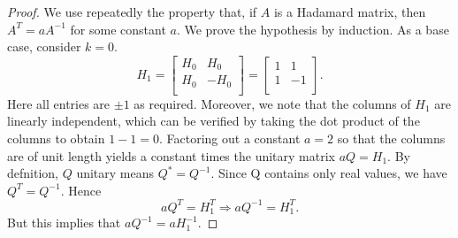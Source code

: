\documentclass{article}
\begin{document}
\begin{proof}
    We use repeatedly the property that, if $A$ is a Hadamard matrix, then $A^T = aA^{-1}$ for some constant $a$. We prove the hypothesis by induction. As a base case, consider $k=0$.
    \[H_1 = \begin{bmatrix}
        H_0 & H_0\\
        H_0 & -H_0\\
    \end{bmatrix} = \begin{bmatrix}
        1 & 1\\
        1 & -1\\
    \end{bmatrix}.\]
    Here all entries are $\pm 1$ as required. Moreover, we note that the columns of $H_1$ are linearly independent, which can be verified by taking the dot product of the columns to obtain $1 - 1 = 0$. Factoring out a constant $a = 2$ so that the columns are of unit length yields a constant times the unitary matrix $aQ = H_1$. By defnition, $Q$ unitary means $Q^* = Q^{-1}$. Since Q contains only real values, we have $Q^T = Q^{-1}$. Hence
    \[aQ^T = H_1^T \Rightarrow aQ^{-1} = H_1^T.\] But this implies that $aQ^{-1} = aH_1^{-1}$. 
    



\end{proof}
\end{document}
